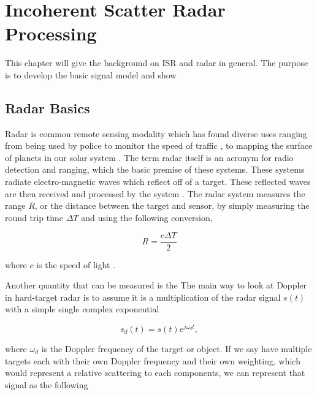 \chapter{Incoherent Scatter Radar Processing}
\label{chapter:isrproc}
\thispagestyle{myheadings}

\graphicspath{{2_ISRProc/Figures/}}

This chapter will give the background on ISR and radar in general. The purpose is to develop the basic signal model and show 
\section{Radar Basics}
Radar is common remote sensing modality which has found diverse uses ranging from being used by police to monitor the speed of traffic \cite{richards2010principles}, to mapping the surface of planets in our solar system \cite{campbell2002radar}. The term radar itself is an acronym for radio detection and ranging, which the basic premise of these systems. These systems radiate electro-magnetic waves which reflect off of a target. These reflected waves are then received and processed by the system \cite{skolnik2008radar}. The radar system measures the range $R$, or the distance between the target and sensor, by simply measuring the round trip time $\Delta T$ and using the following conversion,

\begin{equation}
\label{eqn:range_intro}
R=\frac{c\Delta T}{2}
\end{equation}

\noindent where $c$ is the speed of light \cite{richards2010principles}.

Another quantity that can be measured is the The main way to look at Doppler in hard-target radar is to assume it is a multiplication of the radar signal $s(t)$ with a simple single complex exponential

\begin{equation}
\label{simpledop}
s_d(t) = s(t)e^{j\omega_d t},
\end{equation}
 
\noindent where $\omega_d$ is the Doppler frequency of the target or object.  If we say have multiple targets each with their own Doppler frequency and their own weighting, which would represent a relative scattering to each components,  we can represent that signal as the following

